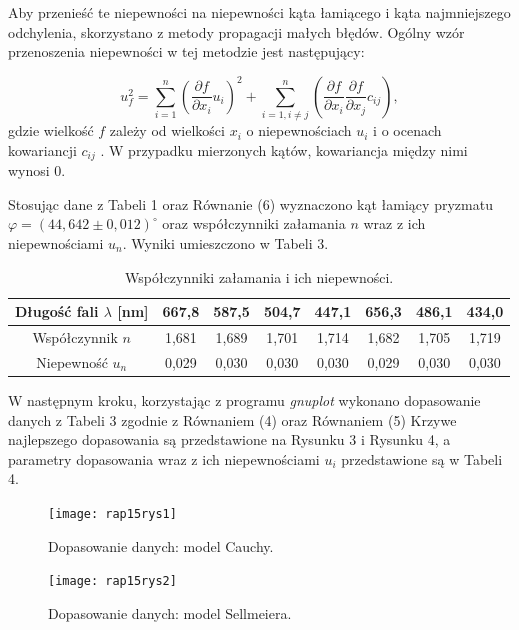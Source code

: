\documentclass[10pt,a4paper]{article}
\begin{document}
Aby przenieść te niepewności na niepewności kąta łamiącego i kąta najmniejszego odchylenia, skorzystano z metody propagacji małych błędów. Ogólny wzór przenoszenia niepewności w tej metodzie jest następujący:

 \begin{equation}
 u_{f}^2=\sum_{i=1}^n \left( \dfrac{\partial f}{\partial x_{i}}u_{i}\right)^2+\sum_{i=1, i\neq j}^n \left( \dfrac{\partial f}{\partial x_{i}}\dfrac{\partial f}{\partial x_{j}}c_{ij}\right),
 \end{equation}
 gdzie wielkość $f$ zależy od wielkości $x_{i}$ o niepewnościach $u_{i}$ i o ocenach kowariancji $c_{ij}$ \cite{tay1}. W przypadku mierzonych kątów, kowariancja między nimi wynosi 0.

Stosując dane z Tabeli 1 oraz Równanie (6) wyznaczono kąt łamiący pryzmatu $\varphi=(44,642\pm0,012)^\circ$ oraz współczynniki załamania $n$ wraz z ich niepewnościami $u_{n}$. Wyniki umieszczono w Tabeli 3.

\begin{table}[h!]
\centering
\caption{Współczynniki załamania i ich niepewności.}
\begin{tabular}{|c|c|c|c|c|c|c|c|}
\hline
Długość fali $\lambda$ [nm] & 667,8 & 587,5 & 504,7 & 447,1 & 656,3 & 486,1 & 434,0 \\ \hline
Współczynnik $n$            & 1,681 & 1,689 & 1,701 & 1,714 & 1,682 & 1,705 & 1,719 \\ \hline
Niepewność $u_{n}$          & 0,029 & 0,030 & 0,030 & 0,030 & 0,029 & 0,030 & 0,030 \\ \hline
\end{tabular}
\end{table}


W następnym kroku, korzystając z programu \textit{gnuplot} wykonano dopasowanie danych z Tabeli 3 zgodnie z Równaniem (4) oraz Równaniem (5) Krzywe najlepszego dopasowania są przedstawione na Rysunku 3 i Rysunku 4, a parametry dopasowania wraz z ich niepewnościami $u_{i}$ przedstawione są w Tabeli 4.


\begin{figure}[h!]
\centering
\begin{minipage}{0.5\textwidth}
  \centering
  \texttt{[image: rap15rys1]} 
\caption{Dopasowanie danych: model Cauchy.}
\end{minipage}%
\begin{minipage}{0.5\textwidth}
  \centering
  \texttt{[image: rap15rys2]} 
\caption{Dopasowanie danych: model Sellmeiera.}
\end{minipage}
\end{figure}
\end{document}
